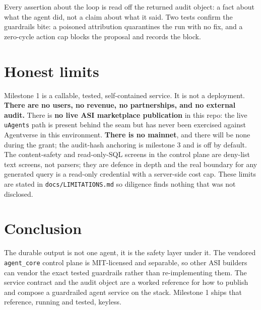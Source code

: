 \documentclass[11pt]{article}
\begin{document}
Every assertion about the loop is read off the returned audit object: a fact
about what the agent did, not a claim about what it said. Two tests confirm the
guardrails bite: a poisoned attribution quarantines the run with no fix, and a
zero-cycle action cap blocks the proposal and records the block.

\section{Honest limits}

Milestone 1 is a callable, tested, self-contained service. It is not a
deployment. \textbf{There are no users, no revenue, no partnerships, and no
external audit.} There is \textbf{no live ASI marketplace publication} in this
repo: the live \texttt{uAgents} path is present behind the seam but has never been
exercised against Agentverse in this environment. \textbf{There is no mainnet},
and there will be none during the grant; the audit-hash anchoring is milestone 3
and is off by default. The content-safety and read-only-SQL screens in the
control plane are deny-list text screens, not parsers; they are defence in depth
and the real boundary for any generated query is a read-only credential with a
server-side cost cap. These limits are stated in \texttt{docs/LIMITATIONS.md} so
diligence finds nothing that was not disclosed.

\section{Conclusion}

The durable output is not one agent, it is the safety layer under it. The
vendored \texttt{agent\_core} control plane is MIT-licensed and separable, so
other ASI builders can vendor the exact tested guardrails rather than
re-implementing them. The service contract and the audit object are a worked
reference for how to publish and compose a guardrailed agent service on the
stack. Milestone 1 ships that reference, running and tested, keyless.



\end{document}
